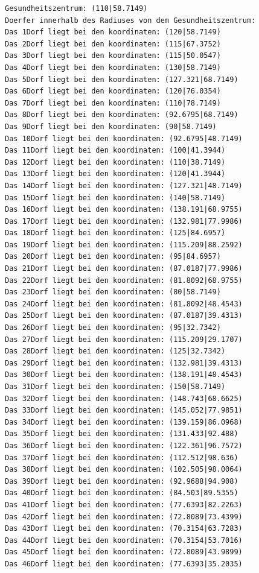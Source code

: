 \documentclass{article}
\begin{document}
\begin{verbatim}
Gesundheitszentrum: (110|58.7149)
Doerfer innerhalb des Radiuses von dem Gesundheitszentrum: 
Das 1Dorf liegt bei den koordinaten: (120|58.7149)
Das 2Dorf liegt bei den koordinaten: (115|67.3752)
Das 3Dorf liegt bei den koordinaten: (115|50.0547)
Das 4Dorf liegt bei den koordinaten: (130|58.7149)
Das 5Dorf liegt bei den koordinaten: (127.321|68.7149)
Das 6Dorf liegt bei den koordinaten: (120|76.0354)
Das 7Dorf liegt bei den koordinaten: (110|78.7149)
Das 8Dorf liegt bei den koordinaten: (92.6795|68.7149)
Das 9Dorf liegt bei den koordinaten: (90|58.7149)
Das 10Dorf liegt bei den koordinaten: (92.6795|48.7149)
Das 11Dorf liegt bei den koordinaten: (100|41.3944)
Das 12Dorf liegt bei den koordinaten: (110|38.7149)
Das 13Dorf liegt bei den koordinaten: (120|41.3944)
Das 14Dorf liegt bei den koordinaten: (127.321|48.7149)
Das 15Dorf liegt bei den koordinaten: (140|58.7149)
Das 16Dorf liegt bei den koordinaten: (138.191|68.9755)
Das 17Dorf liegt bei den koordinaten: (132.981|77.9986)
Das 18Dorf liegt bei den koordinaten: (125|84.6957)
Das 19Dorf liegt bei den koordinaten: (115.209|88.2592)
Das 20Dorf liegt bei den koordinaten: (95|84.6957)
Das 21Dorf liegt bei den koordinaten: (87.0187|77.9986)
Das 22Dorf liegt bei den koordinaten: (81.8092|68.9755)
Das 23Dorf liegt bei den koordinaten: (80|58.7149)
Das 24Dorf liegt bei den koordinaten: (81.8092|48.4543)
Das 25Dorf liegt bei den koordinaten: (87.0187|39.4313)
Das 26Dorf liegt bei den koordinaten: (95|32.7342)
Das 27Dorf liegt bei den koordinaten: (115.209|29.1707)
Das 28Dorf liegt bei den koordinaten: (125|32.7342)
Das 29Dorf liegt bei den koordinaten: (132.981|39.4313)
Das 30Dorf liegt bei den koordinaten: (138.191|48.4543)
Das 31Dorf liegt bei den koordinaten: (150|58.7149)
Das 32Dorf liegt bei den koordinaten: (148.743|68.6625)
Das 33Dorf liegt bei den koordinaten: (145.052|77.9851)
Das 34Dorf liegt bei den koordinaten: (139.159|86.0968)
Das 35Dorf liegt bei den koordinaten: (131.433|92.488)
Das 36Dorf liegt bei den koordinaten: (122.361|96.7572)
Das 37Dorf liegt bei den koordinaten: (112.512|98.636)
Das 38Dorf liegt bei den koordinaten: (102.505|98.0064)
Das 39Dorf liegt bei den koordinaten: (92.9688|94.908)
Das 40Dorf liegt bei den koordinaten: (84.503|89.5355)
Das 41Dorf liegt bei den koordinaten: (77.6393|82.2263)
Das 42Dorf liegt bei den koordinaten: (72.8089|73.4399)
Das 43Dorf liegt bei den koordinaten: (70.3154|63.7283)
Das 44Dorf liegt bei den koordinaten: (70.3154|53.7016)
Das 45Dorf liegt bei den koordinaten: (72.8089|43.9899)
Das 46Dorf liegt bei den koordinaten: (77.6393|35.2035)

\end{verbatim}
\end{document}
